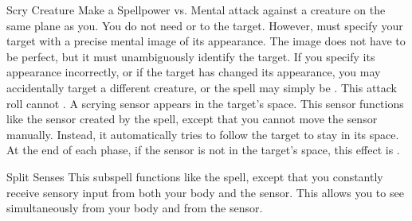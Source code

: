 \begin{ability}[\nth{5}]{Scry Creature}
Make a Spellpower vs. Mental attack against a creature on the same plane as you.
You do not need  or  to the target.
However,  must specify your target with a precise mental image of its appearance.
The image does not have to be perfect, but it must unambiguously identify the target.
If you specify its appearance incorrectly, or if the target has changed its appearance, you may accidentally target a different creature, or the spell may simply be .
This attack roll cannot .
\hit A scrying sensor appears in the target's space.
This sensor functions like the sensor created by the  spell, except that you cannot move the sensor manually.
Instead, it automatically tries to follow the target to stay in its space.
At the end of each phase, if the sensor is not in the target's space, this effect is .
\end{ability}
\vspace{0.25em}


\begin{ability}[\nth{5}]{Split Senses}
This subspell functions like the  spell, except that you constantly receive sensory input from both your body and the sensor.
This allows you to see simultaneously from your body and from the sensor.
\end{ability}
\vspace{0.25em}


